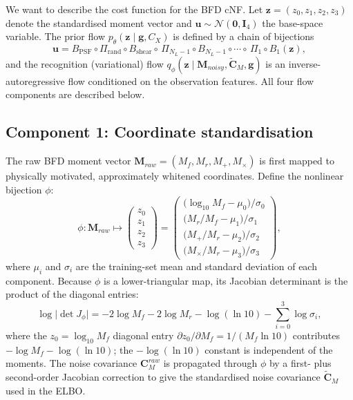 We want to describe the cost function for the BFD cNF.  Let
$\mathbf{z}=(z_0,z_1,z_2,z_3)$ denote the standardised moment vector and
$\mathbf{u}\sim\mathcal{N}(\mathbf{0},\mathbf{I}_4)$ the base-space variable.
The prior flow $p_\theta(\mathbf{z}\mid\mathbf{g},C_X)$ is defined by a chain of bijections
\begin{equation}
  \mathbf{u}
  = B_{\mathrm{PSF}} \circ \Pi_{\mathrm{rand}} \circ B_{\mathrm{shear}}
  \circ\,\Pi_{N_L-1}\circ B_{N_L-1}\circ\cdots
  \circ\,\Pi_1\circ B_1(\mathbf{z}),
  \label{eq:chain}
\end{equation}
and the recognition (variational) flow $q_\phi(\mathbf{z}\mid\mathbf{M}_{noisy},\tilde{\mathbf{C}}_M,\mathbf{g})$
is an inverse-autoregressive flow conditioned on the observation features.
All four flow components are described below.

\subsection*{Component 1: Coordinate standardisation}

The raw BFD moment vector $\mathbf{M}_{raw}=(M_f,M_r,M_+,M_\times)$ is first
mapped to physically motivated, approximately whitened coordinates.  Define
the nonlinear bijection $\phi$:
\begin{equation}
  \phi\colon\mathbf{M}_{raw}\longmapsto
  \begin{pmatrix}
    z_0 \\ z_1 \\ z_2 \\ z_3
  \end{pmatrix}
  =
  \begin{pmatrix}
    \bigl(\log_{10}M_f - \mu_0\bigr)/\sigma_0 \\
    \bigl(M_r/M_f       - \mu_1\bigr)/\sigma_1 \\
    \bigl(M_+/M_r       - \mu_2\bigr)/\sigma_2 \\
    \bigl(M_\times/M_r  - \mu_3\bigr)/\sigma_3
  \end{pmatrix},
  \label{eq:phi}
\end{equation}
where $\mu_i$ and $\sigma_i$ are the training-set mean and standard deviation
of each component.  Because $\phi$ is a lower-triangular map, its Jacobian
determinant is the product of the diagonal entries:
\begin{equation}
  \log\bigl|\det J_\phi\bigr|
  = -2\log M_f - 2\log M_r - \log(\ln 10)
    - \sum_{i=0}^{3}\log\sigma_i,
\end{equation}
where the $z_0=\log_{10}M_f$ diagonal entry $\partial z_0/\partial M_f
=1/(M_f\ln 10)$ contributes $-\log M_f-\log(\ln 10)$; the $-\log(\ln 10)$
constant is independent of the moments.
The noise covariance $\mathbf{C}_M^{raw}$ is propagated through $\phi$ by a
first- plus second-order Jacobian correction to give the standardised noise
covariance $\tilde{\mathbf{C}}_M$ used in the ELBO.

